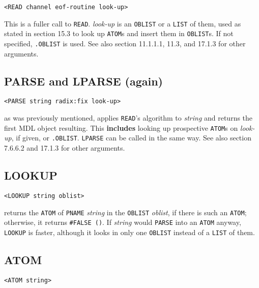 \documentclass[a4paper]{scrbook}
\begin{document}
\begin{verbatim}
<READ channel eof-routine look-up>
\end{verbatim}

 This is a fuller call to \texttt{READ}. \emph{look-up} is an \texttt{OBLIST} or a
\texttt{LIST} of them, used as stated in section 15.3 to look up \texttt{ATOM}s and insert them in \texttt{OBLIST}s. If not
specified, \texttt{.OBLIST} is used. See also section 11.1.1.1, 11.3, and 17.1.3 for other arguments.

\subsection{PARSE and LPARSE (again)}\label{parse-and-lparse-again}

\begin{verbatim}
<PARSE string radix:fix look-up>
\end{verbatim}

 as was previously mentioned, applies \texttt{READ}'s algorithm to \emph{string} and returns
the first MDL object resulting. This \textbf{includes} looking up prospective \texttt{ATOM}s on \emph{look-up}, if given,
or \texttt{.OBLIST}. \texttt{LPARSE} can be called in the same way. See also section 7.6.6.2
and 17.1.3 for other arguments.

\subsection{LOOKUP}\label{lookup}

\begin{verbatim}
<LOOKUP string oblist>
\end{verbatim}

 returns the \texttt{ATOM} of \texttt{PNAME} \emph{string} in the \texttt{OBLIST}
\emph{oblist}, if there is such an \texttt{ATOM}; otherwise, it returns \texttt{\#FALSE\ ()}. If \emph{string} would
\texttt{PARSE} into an \texttt{ATOM} anyway, \texttt{LOOKUP} is faster, although it looks in only one
\texttt{OBLIST} instead of a \texttt{LIST} of them.

\subsection{ATOM}\label{atom}

\begin{verbatim}
<ATOM string>
\end{verbatim}
\end{document}
